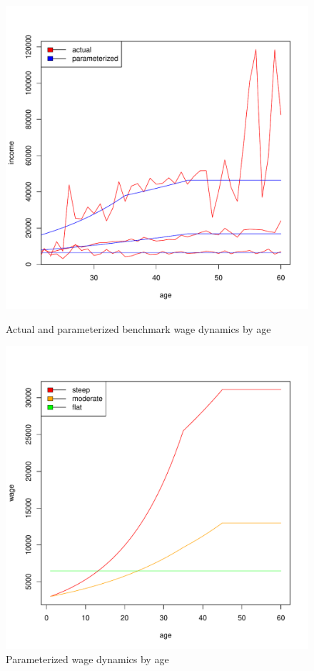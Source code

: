 \begin{figure}[h]
	\centering
    \begin{minipage}{0.45\textwidth}
		\centering
		\includegraphics[scale=0.4]{figs/heterwage.pdf}
		\caption{Actual and parameterized benchmark wage dynamics by age}
	\end{minipage}
	\hfill
    \begin{minipage}{0.45\textwidth}
		\centering
		\includegraphics[scale=0.4]{figs/heterwageless.pdf}
		\caption{Parameterized wage dynamics by age}
	\end{minipage}

\end{figure}


